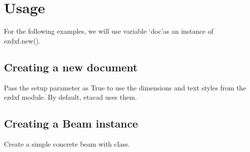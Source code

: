 \documentclass[a4paper,10pt,english]{sphinxmanual}
\begin{document}
\sphinxstepscope


\chapter{Usage}
\label{\detokenize{usage:usage}}\label{\detokenize{usage::doc}}
\sphinxAtStartPar
For the following examples, we will use variable ‘doc’as an instance of ezdxf.new().

\begin{sphinxVerbatim}[commandchars=\\\{\}]
 
\end{sphinxVerbatim}


\section{Creating a new document}
\label{\detokenize{usage:creating-a-new-document}}
\sphinxAtStartPar
Pass the setup parameter as True to use the dimensions and text styles from the ezdxf module. By default, etacad
uses them.

\begin{sphinxVerbatim}[commandchars=\\\{\}]
   
\end{sphinxVerbatim}


\section{Creating a Beam instance}
\label{\detokenize{usage:creating-a-beam-instance}}
\sphinxAtStartPar
Create a simple concrete beam with {\hyperref[\detokenize{API:etacad.beam.Beam}]{}} class.

\begin{sphinxVerbatim}[commandchars=\\\{\}]
   

  
             
               
\end{sphinxVerbatim}
\end{document}
